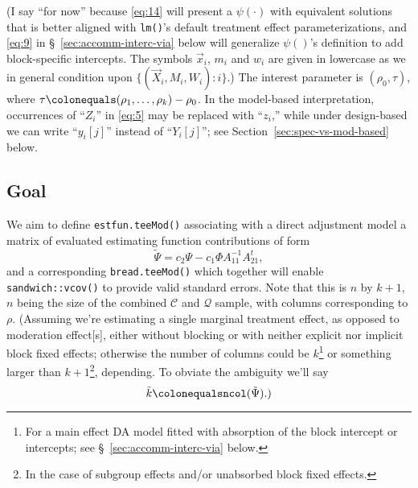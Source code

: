 \documentclass{article}
\newcommand{\defeq}{\ensuremath{\colonequals}}
\begin{document}
(I say ``for now'' because \eqref{eq:14} will present a
$\psi(\cdot)$ with equivalent solutions that is better aligned with
\texttt{lm()}'s default treatment effect parameterizations, and
\eqref{eq:9} in \S~\ref{sec:accomm-interc-via} below will generalize $\psi()$'s definition
to add block-specific intercepts.  The symbols $\vec{x}_{i}$, $m_{i}$
and $w_{i}$ are given in lowercase as we in general condition upon
$\{(\vec{X}_{i}, M_{i}, W_{i}): i\}$.)
The interest parameter is $(\rho_{0}, \tau)$, where $\tau \defeq (\rho_{1}, \ldots, \rho_{k}) - \rho_{0}$. In the model-based interpretation, occurrences of ``$Z_{i}$'' in \eqref{eq:5} may be replaced with ``$z_{i}$,'' while under design-based we can write ``$y_{i}[j]$'' instead of ``$Y_{i}[j]$''; see Section~\ref{sec:spec-vs-mod-based} below.

\subsection{Goal} \label{sec:goal}
We aim to define \texttt{estfun.teeMod()} associating
with a direct adjustment model a matrix of evaluated estimating function
contributions of form
\begin{equation} \label{eq:22}
  \tilde{\Psi} = c_{2}\Psi - c_{1}\Phi A_{11}^{-1}A_{21}^{t},
\end{equation}
and a corresponding \texttt{bread.teeMod()} which together will enable \texttt{sandwich::vcov()} to provide valid standard errors.
Note that this is $n$ by
$k+1$, $n$ being the size of the combined $\mathcal{C}$ and
$\mathcal{Q}$ sample, with columns corresponding to $\rho$.%
(Assuming we're estimating a single marginal treatment effect, as
opposed to moderation effect[s], either without blocking or with
neither explicit nor implicit block fixed effects; otherwise the
number of columns could be $k$\footnote{For a main effect
DA model fitted with absorption of the block intercept or
intercepts; see \S~\ref{sec:accomm-interc-via} below.} or something
larger than $k+1$\footnote{In the case of subgroup effects and/or unabsorbed block fixed effects.},
depending. To obviate the ambiguity we'll say
\begin{equation*}
  \tilde{k} \defeq \mathtt{ncol}(\tilde{\Psi}).)
\end{equation*}
\end{document}
